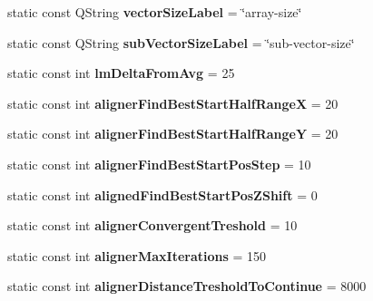 \begin{DoxyCompactItemize}
\item 
\hypertarget{class_common_a498498e6a4d416d4efced0104ea940fc}{static const Q\+String {\bfseries vector\+Size\+Label} = \char`\"{}array-\/size\char`\"{}}\label{class_common_a498498e6a4d416d4efced0104ea940fc}

\item 
\hypertarget{class_common_a38b6aef5c0c207a1e58bdbc667e83a10}{static const Q\+String {\bfseries sub\+Vector\+Size\+Label} = \char`\"{}sub-\/vector-\/size\char`\"{}}\label{class_common_a38b6aef5c0c207a1e58bdbc667e83a10}

\item 
\hypertarget{class_common_ae48ebebd62ac0f81958423994b31601a}{static const int {\bfseries lm\+Delta\+From\+Avg} = 25}\label{class_common_ae48ebebd62ac0f81958423994b31601a}

\item 
\hypertarget{class_common_a951f096df9a306a5b0052504660e1963}{static const int {\bfseries aligner\+Find\+Best\+Start\+Half\+Range\+X} = 20}\label{class_common_a951f096df9a306a5b0052504660e1963}

\item 
\hypertarget{class_common_a6e256128b223d6ee94cdd18973793508}{static const int {\bfseries aligner\+Find\+Best\+Start\+Half\+Range\+Y} = 20}\label{class_common_a6e256128b223d6ee94cdd18973793508}

\item 
\hypertarget{class_common_a64b0796757d9549f7ad8201022fc9990}{static const int {\bfseries aligner\+Find\+Best\+Start\+Pos\+Step} = 10}\label{class_common_a64b0796757d9549f7ad8201022fc9990}

\item 
\hypertarget{class_common_affda2d871f10e8df72423f556ff20606}{static const int {\bfseries aligned\+Find\+Best\+Start\+Pos\+Z\+Shift} = 0}\label{class_common_affda2d871f10e8df72423f556ff20606}

\item 
\hypertarget{class_common_a0eb19b4ea6acabeb22e4ccf715f87143}{static const int {\bfseries aligner\+Convergent\+Treshold} = 10}\label{class_common_a0eb19b4ea6acabeb22e4ccf715f87143}

\item 
\hypertarget{class_common_a2a5e4133d399107bbfb1156bb2ef1bc6}{static const int {\bfseries aligner\+Max\+Iterations} = 150}\label{class_common_a2a5e4133d399107bbfb1156bb2ef1bc6}

\item 
\hypertarget{class_common_a3d88cdbe422020b9bf1f9f96b4698100}{static const int {\bfseries aligner\+Distance\+Treshold\+To\+Continue} = 8000}\label{class_common_a3d88cdbe422020b9bf1f9f96b4698100}


\end{DoxyCompactItemize}
